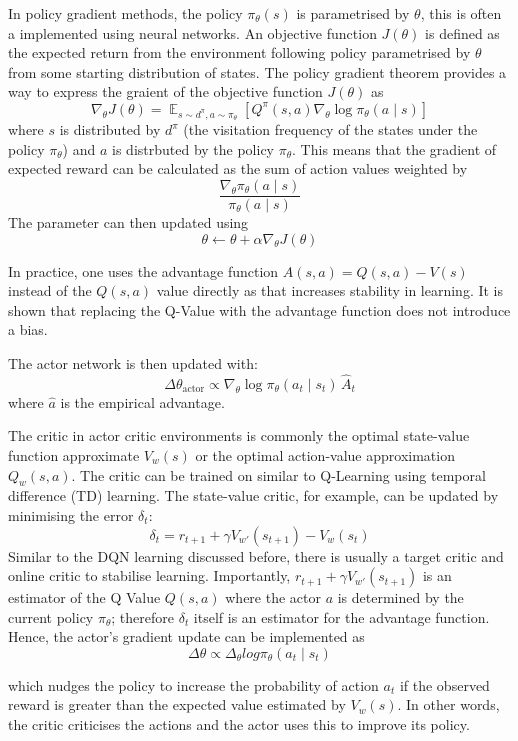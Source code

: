 \documentclass[12pt,a4paper]{report}
\DeclareMathOperator{\EX}{\mathbb{E}}
\begin{document}
In policy gradient methods, the policy $\pi_\theta(s)$ is parametrised by $\theta$, this is often a implemented using neural networks. An objective function $J(\theta)$ is defined as the expected return from the environment following policy parametrised by $\theta$ from some starting distribution of states. The policy gradient theorem provides a way to express the graient of the objective function $J(\theta)$ as 
\[
\nabla_{\theta} J(\theta) = \EX_{s \sim d^{\pi}, a \sim \pi_{\theta}} \left[ Q^{\pi}(s, a) \nabla_{\theta} \log \pi_{\theta}(a \mid s) \right]
\]
where $s$ is distributed by $d^\pi$ (the visitation frequency of the states under the policy $\pi_\theta$) and $a$ is distrbuted by the policy $\pi_\theta$. This means that the gradient of expected reward can be calculated as the sum of action values weighted by 
\[
\frac{\nabla_{\theta} \pi_{\theta}(a \mid s)}{\pi_{\theta}(a \mid s)} 
\]
The parameter can then updated using 
\[
\theta \leftarrow \theta + \alpha \nabla_{\theta} J(\theta)
\] \par
In practice, one uses the advantage function $A(s, a) = Q(s, a) - V(s)$ instead of the $Q(s, a)$ value directly as that increases stability in learning. It is shown that replacing the Q-Value with the advantage function does not introduce a bias. 

The actor network is then updated with:
\[
\Delta \theta_{\text{actor}} \propto \nabla_{\theta} \log \pi_{\theta}(a_t \mid s_t) \, \hat{A}_t
\]
where $\hat{a}$ is the empirical advantage.\par 

The critic in actor critic environments is commonly the optimal state-value function approximate $V_w(s)$ or the optimal action-value approximation $Q_w(s,a)$. The critic can be trained on similar to Q-Learning using temporal difference (TD) learning. The state-value critic, for example, can be updated by minimising the error $\delta_t$:
\[
\delta_t = r_{t+1} + \gamma V_{w'}(s_{t+1}) - V_{w}(s_t)
\]
Similar to the DQN learning discussed before, there is usually a target critic and online critic to stabilise learning. Importantly, $ r_{t+1} + \gamma V_{w'}(s_{t+1})$ is an estimator of the Q Value $Q(s,a)$ where the actor $a$ is determined by the current policy $\pi_\theta$; therefore $\delta_t$ itself is an estimator for the advantage function. Hence, the actor's gradient update can be implemented as 
\[\Delta \theta \propto \Delta_\theta log \pi_\theta (a_t \mid s_t)\]

which nudges the policy to increase the probability of action $a_t$ if the observed reward is greater than the expected value estimated by $V_w(s)$. In other words, the critic criticises the actions and the actor uses this to improve its policy. \par
\end{document}
